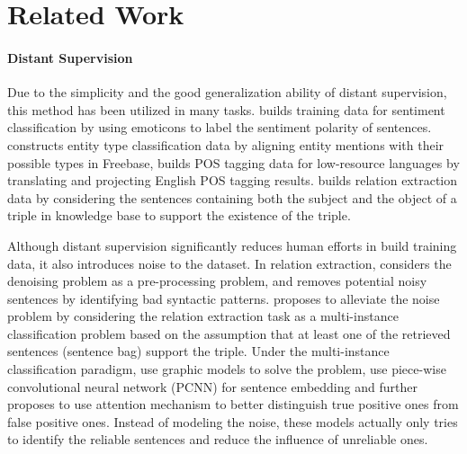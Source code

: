 \section{Related Work}

\paragraph{Distant Supervision}


Due to the simplicity and the good generalization ability of distant supervision, this method has been utilized in many tasks. \cite{go2009twitter} builds training data for sentiment classification by using emoticons to label the sentiment polarity of sentences. \cite{ritter2011named} constructs entity type classification data by aligning entity mentions with their possible types in Freebase, \cite{duong2014can} builds POS tagging data for low-resource languages by translating and projecting English POS tagging results. \cite{mintz2009distant} builds relation extraction data by considering the sentences containing both the subject and the object of a triple in knowledge base to support the existence of the triple. 

Although distant supervision significantly reduces human efforts in build training data, it also introduces noise to the dataset. In relation extraction, \cite{takamatsu2012reducing} considers the denoising problem as a pre-processing problem, and removes potential noisy sentences by identifying bad syntactic patterns. \cite{riedel2010modeling} proposes to alleviate the noise problem by considering the relation extraction task as a multi-instance classification problem based on the assumption that at least one of the retrieved sentences (sentence bag) support the triple. Under the multi-instance classification paradigm, \cite{hoffmann2011knowledge,surdeanu2012multi} use graphic models to solve the problem, \cite{zeng2015distant} use piece-wise convolutional neural network (PCNN) for sentence embedding and \cite{lin2016neural} further proposes to use attention mechanism to better distinguish true positive ones from false positive ones. Instead of modeling the noise, these models actually only tries to identify the reliable sentences and reduce the influence of unreliable ones.

